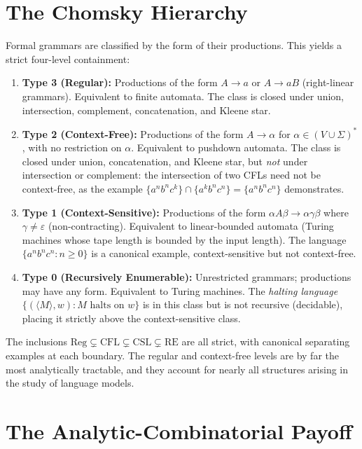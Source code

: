 \section{The Chomsky Hierarchy}

Formal grammars are classified by the form of their productions. This yields a strict four-level containment:

\begin{enumerate}
\item \textbf{Type 3 (Regular):} Productions of the form $A \to a$ or $A \to aB$ (right-linear grammars). Equivalent to finite automata. The class is closed under union, intersection, complement, concatenation, and Kleene star.

\item \textbf{Type 2 (Context-Free):} Productions of the form $A \to \alpha$ for $\alpha \in (V \cup \Sigma)^*$, with no restriction on $\alpha$. Equivalent to pushdown automata. The class is closed under union, concatenation, and Kleene star, but \emph{not} under intersection or complement: the intersection of two CFLs need not be context-free, as the example $\{a^n b^n c^k\} \cap \{a^k b^n c^n\} = \{a^n b^n c^n\}$ demonstrates.

\item \textbf{Type 1 (Context-Sensitive):} Productions of the form $\alpha A \beta \to \alpha \gamma \beta$ where $\gamma \neq \varepsilon$ (non-contracting). Equivalent to linear-bounded automata (Turing machines whose tape length is bounded by the input length). The language $\{a^n b^n c^n : n \ge 0\}$ is a canonical example, context-sensitive but not context-free.

\item \textbf{Type 0 (Recursively Enumerable):} Unrestricted grammars; productions may have any form. Equivalent to Turing machines. The \emph{halting language} $\{(\langle M \rangle, w) : M \text{ halts on } w\}$ is in this class but is not recursive (decidable), placing it strictly above the context-sensitive class.
\end{enumerate}

The inclusions $\text{Reg} \subsetneq \text{CFL} \subsetneq \text{CSL} \subsetneq \text{RE}$ are all strict, with canonical separating examples at each boundary. The regular and context-free levels are by far the most analytically tractable, and they account for nearly all structures arising in the study of language models.

\section{The Analytic-Combinatorial Payoff}

